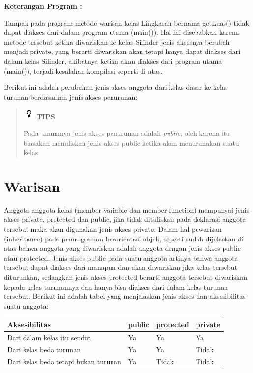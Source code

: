 \textbf{Keterangan Program :}

Tampak pada program metode warisan kelas Lingkaran bernama getLuas()
tidak dapat diakses dari dalam program utama (main()). Hal ini
disebabkan karena metode tersebut ketika diwariskan ke kelas Silinder
jenis aksesnya berubah menjadi private, yang berarti diwariskan akan
tetapi hanya dapat diakses dari dalam kelas Silinder, akibatnya ketika
akan diakses dari program utama (main()), terjadi kesalahan kompilasi
seperti di atas.

Berikut ini adalah perubahan jenis akses anggota dari kelas dasar ke
kelas turunan berdasarkan jenis akses penurunan:

\begin{quotation}
\includegraphics{../manuscript/images/tips}	\textbf{TIPS} 
	
	Pada
	umumnya jenis akses penurunan adalah \emph{public}, oleh karena itu
	biasakan menuliskan jenis akses public ketika akan menurunakan suatu
	kelas.
\end{quotation}
 

\section{Warisan}\label{warisan}

Anggota-anggota kelas (member variable dan member function) mempunyai
jenis akses private, protected dan public, jika tidak dituliskan pada
deklarasi anggota tersebut maka akan digunakan jenis akses private.
Dalam hal pewarisan (inheritance) pada pemrograman berorientasi objek,
seperti sudah dijelaskan di atas bahwa anggota yang diwariskan adalah
anggota dengan jenis akses public atau protected. Jenis akses public
pada suatu anggota artinya bahwa anggota tersebut dapat diakses dari
manapun dan akan diwariskan jika kelas tersebut diturunkan, sedangkan
jenis akses protected berarti anggota tersebut diwariskan kepada kelas
turunannya dan hanya bisa diakses dari dalam kelas turunan tersebut.
Berikut ini adalah tabel yang menjelaskan jenis akses dan aksesibilitas
suatu anggota:

\begin{longtable}[]{@{}llll@{}}
\toprule
Aksesibilitas & public & protected & private\tabularnewline
\midrule
\endhead
Dari dalam kelas itu sendiri & Ya & Ya & Ya\tabularnewline
Dari kelas beda turunan & Ya & Ya & Tidak\tabularnewline
Dari kelas beda tetapi bukan turunan & Ya & Tidak & Tidak\tabularnewline
\bottomrule
\end{longtable}

